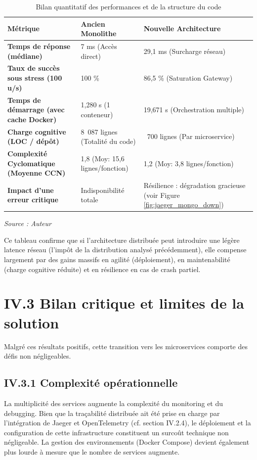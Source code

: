 \begin{table}[H]
    \centering
    \renewcommand{\arraystretch}{1.3}
    \begin{tabular}{|p{3.5cm}|p{5cm}|p{5cm}|}
        \hline
        \textbf{Métrique} & \textbf{Ancien Monolithe} & \textbf{Nouvelle Architecture} \\
        \hline
        \textbf{Temps de réponse (médiane)} & 7 ms (Accès direct) & 29,1 ms (Surcharge réseau) \\
        \hline
        \textbf{Taux de succès sous stress (100 u/s)} & 100 \% & 86,5 \% (Saturation Gateway) \\
        \hline
        \textbf{Temps de démarrage (avec cache Docker)} & 1,280 s (1 conteneur) & 19,671 s (Orchestration multiple) \\
        \hline
        \textbf{Charge cognitive (LOC / dépôt)} & 8~087 lignes (Totalité du code) & ~700 lignes (Par microservice) \\
        \hline
        \textbf{Complexité Cyclomatique (Moyenne CCN)} & 1,8 (Moy: 15,6 lignes/fonction) & 1,2 (Moy: 3,8 lignes/fonction) \\
        \hline
        \textbf{Impact d'une erreur critique} & Indisponibilité totale & Résilience : dégradation gracieuse (voir Figure \ref{fig:jaeger_mongo_down}) \\
        \hline
    \end{tabular}
    \caption{Bilan quantitatif des performances et de la structure du code}
    \vspace{0.2cm}\small\textit{Source : Auteur}
    \label{tab:metrics_comparison}
\end{table}

Ce tableau confirme que si l'architecture distribuée peut introduire une légère latence réseau (l'impôt de la distribution analysé précédemment), elle compense largement par des gains massifs en agilité (déploiement), en maintenabilité (charge cognitive réduite) et en résilience en cas de crash partiel.

\section{IV.3 Bilan critique et limites de la solution}
Malgré ces résultats positifs, cette transition vers les microservices comporte des défis non négligeables.

\subsection{IV.3.1 Complexité opérationnelle}
La multiplicité des services augmente la complexité du monitoring et du debugging. Bien que la traçabilité distribuée ait été prise en charge par l'intégration de Jaeger et OpenTelemetry (cf. section IV.2.4), le déploiement et la configuration de cette infrastructure constituent un surcoût technique non négligeable. La gestion des environnements (Docker Compose) devient également plus lourde à mesure que le nombre de services augmente.

